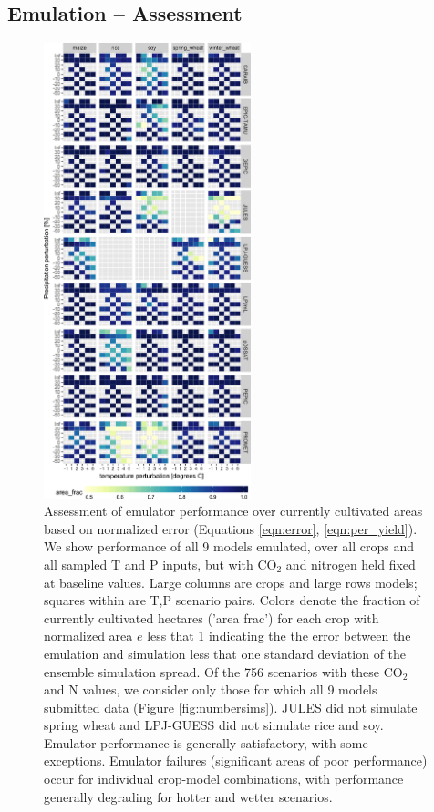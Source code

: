\documentclass[esd, final]{copernicus} %
\begin{document}
\subsection{Emulation -- Assessment}
\label{A:2}
\begin{figure}[h]
\centering
    \includegraphics[width=6cm]{figures/error_360.png}
    \caption{Assessment of emulator performance over currently cultivated areas based on normalized error (Equations \ref{eqn:error}, \ref{eqn:per_yield}). We show performance of all 9 models emulated, over all crops and all sampled T and P inputs, but with CO$_2$ and nitrogen held fixed at baseline values. Large columns are crops and large rows models; squares within are T,P scenario pairs. Colors denote the fraction of currently cultivated hectares ('area frac') for each crop with normalized area $e$ less that 1 indicating the the error between the emulation and simulation less that one standard deviation of the ensemble simulation spread. Of the 756 scenarios with these CO$_2$ and N values, we consider only those for which all 9 models submitted data (Figure \ref{fig:numbersims}). JULES did not simulate spring wheat and LPJ-GUESS did not simulate rice and soy. Emulator performance is generally satisfactory, with some exceptions. Emulator failures (significant areas of poor performance) occur for individual crop-model combinations, with performance generally degrading for hotter and wetter scenarios.}
   \label{fig:error_360}
\end{figure}
\end{document}
